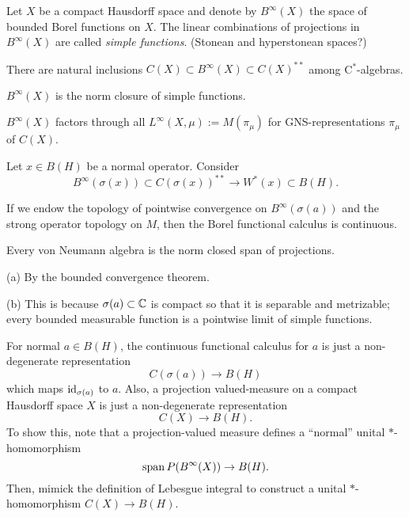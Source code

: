 \documentclass{../../large}
\begin{document}
\begin{prb}
Let $X$ be a compact Hausdorff space and denote by $B^\infty(X)$ the space of bounded Borel functions on $X$.
The linear combinations of projections in $B^\infty(X)$ are called \emph{simple functions}.
(Stonean and hyperstonean spaces?)
\begin{parts}
\item There are natural inclusions $C(X)\subset B^\infty(X)\subset C(X)^{**}$ among C$^*$-algebras.
\item $B^\infty(X)$ is the norm closure of simple functions.
\item $B^\infty(X)$ factors through all $L^\infty(X,\mu):=M(\pi_\mu)$ for GNS-representations $\pi_\mu$ of $C(X)$.
\end{parts}
\end{prb}

\begin{prb}
Let $x\in B(H)$ be a normal operator.
Consider
\[B^\infty(\sigma(x))\subset C(\sigma(x))^{**}\to W^*(x)\subset B(H).\]
\begin{parts}
\item If we endow the topology of pointwise convergence on $B^\infty(\sigma(a))$ and the strong operator topology on $M$, then the Borel functional calculus is continuous.
\item Every von Neumann algebra is the norm closed span of projections.
\end{parts}
\end{prb}
\begin{pf}
(a)
By the bounded convergence theorem.

(b)
This is because $\sigma(a)\subset\mathbb{C}$ is compact so that it is separable and metrizable; every bounded measurable function is a pointwise limit of simple functions.

\end{pf}



For normal $a\in B(H)$, the continuous functional calculus for $a$ is just a non-degenerate representation
\[C(\sigma(a))\to B(H)\]
which maps $\operatorname{id}_{\sigma(a)}$ to $a$.
Also, a projection valued-measure on a compact Hausdorff space $X$ is just a non-degenerate representation
\[C(X)\to B(H).\]
To show this, note that a projection-valued measure defines a ``normal'' unital $*$-homomorphism
\[\operatorname{span} P(B^\infty(X))\to B(H).\]
Then, mimick the definition of Lebesgue integral to construct a unital $*$-homomorphism $C(X)\to B(H)$.
\end{document}
